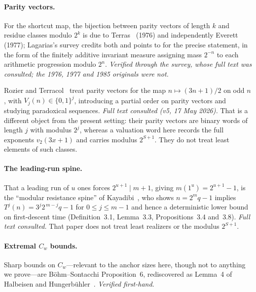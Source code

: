 \documentclass[11pt,a4paper]{article}
\theoremstyle{plain}
\theoremstyle{definition}
\begin{document}
\paragraph{Parity vectors.}
For the shortcut map, the bijection between parity vectors of length $k$ and
residue classes modulo $2^{k}$ is due to Terras~\cite{terras1976} (1976) and
independently Everett~\cite{everett1977} (1977); Lagarias's survey
\cite{lagarias2010} credits both and points to \cite[Theorem~B]{lagarias1985}
for the precise statement, in the form of the finitely additive invariant
measure assigning mass $2^{-n}$ to each arithmetic progression modulo $2^{n}$.
\emph{Verified through the survey, whose full text was consulted; the 1976,
1977 and 1985 originals were not.}

Rozier and Terracol~\cite{rozierterracol} treat parity vectors for the map
$n\mapsto(3n+1)/2$ on odd $n$, with $V_j(n)\in\{0,1\}^{j}$, introducing a
partial order on parity vectors and studying paradoxical sequences.
\emph{Full text consulted (v5, 17 May 2026).} That is a different object from
the present setting: their parity vectors are binary words of length $j$ with
modulus $2^{j}$, whereas a valuation word here records the full exponents
$v_2(3x+1)$ and carries modulus $2^{S+1}$. They do not treat least elements of
such classes.

\paragraph{The leading-run spine.}
That a leading run of $u$ ones forces $2^{u+1}\mid m+1$, giving
$m(1^{u})=2^{u+1}-1$, is the ``modular resistance spine'' of
Kayadibi~\cite{kayadibi2026}, who shows $n=2^{m}q-1$ implies
$T^{j}(n)=3^{j}2^{\,m-j}q-1$ for $0\le j\le m-1$ and hence a deterministic
lower bound on first-descent time (Definition~3.1, Lemma~3.3,
Propositions~3.4 and~3.8). \emph{Full text consulted.} That paper does not
treat least realizers or the modulus $2^{S+1}$.

\paragraph{Extremal $C_w$ bounds.}
Sharp bounds on $C_w$---relevant to the anchor sizes here, though not to
anything we prove---are B\"ohm--Sontacchi Proposition~6, rediscovered as
Lemma~4 of Halbeisen and Hungerb\"uhler~\cite{hh1997}. \emph{Verified
first-hand.}
\end{document}
